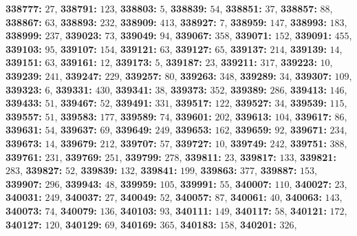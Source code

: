 \textsf{\bfseries 338777:} $27$, \textsf{\bfseries 338791:} $123$, \textsf{\bfseries 338803:} $5$, \textsf{\bfseries 338839:} $54$, \textsf{\bfseries 338851:} $37$, \textsf{\bfseries 338857:} $88$, \textsf{\bfseries 338867:} $63$, \textsf{\bfseries 338893:} $232$, \textsf{\bfseries 338909:} $413$, \textsf{\bfseries 338927:} $7$, \textsf{\bfseries 338959:} $147$, \textsf{\bfseries 338993:} $183$, \textsf{\bfseries 338999:} $237$, \textsf{\bfseries 339023:} $73$, \textsf{\bfseries 339049:} $94$, \textsf{\bfseries 339067:} $358$, \textsf{\bfseries 339071:} $152$, \textsf{\bfseries 339091:} $455$, \textsf{\bfseries 339103:} $95$, \textsf{\bfseries 339107:} $154$, \textsf{\bfseries 339121:} $63$, \textsf{\bfseries 339127:} $65$, \textsf{\bfseries 339137:} $214$, \textsf{\bfseries 339139:} $14$, \textsf{\bfseries 339151:} $63$, \textsf{\bfseries 339161:} $12$, \textsf{\bfseries 339173:} $5$, \textsf{\bfseries 339187:} $23$, \textsf{\bfseries 339211:} $317$, \textsf{\bfseries 339223:} $10$, \textsf{\bfseries 339239:} $241$, \textsf{\bfseries 339247:} $229$, \textsf{\bfseries 339257:} $80$, \textsf{\bfseries 339263:} $348$, \textsf{\bfseries 339289:} $34$, \textsf{\bfseries 339307:} $109$, \textsf{\bfseries 339323:} $6$, \textsf{\bfseries 339331:} $430$, \textsf{\bfseries 339341:} $38$, \textsf{\bfseries 339373:} $352$, \textsf{\bfseries 339389:} $286$, \textsf{\bfseries 339413:} $146$, \textsf{\bfseries 339433:} $51$, \textsf{\bfseries 339467:} $52$, \textsf{\bfseries 339491:} $331$, \textsf{\bfseries 339517:} $122$, \textsf{\bfseries 339527:} $34$, \textsf{\bfseries 339539:} $115$, \textsf{\bfseries 339557:} $51$, \textsf{\bfseries 339583:} $177$, \textsf{\bfseries 339589:} $74$, \textsf{\bfseries 339601:} $202$, \textsf{\bfseries 339613:} $104$, \textsf{\bfseries 339617:} $86$, \textsf{\bfseries 339631:} $54$, \textsf{\bfseries 339637:} $69$, \textsf{\bfseries 339649:} $249$, \textsf{\bfseries 339653:} $162$, \textsf{\bfseries 339659:} $92$, \textsf{\bfseries 339671:} $234$, \textsf{\bfseries 339673:} $14$, \textsf{\bfseries 339679:} $212$, \textsf{\bfseries 339707:} $57$, \textsf{\bfseries 339727:} $10$, \textsf{\bfseries 339749:} $242$, \textsf{\bfseries 339751:} $388$, \textsf{\bfseries 339761:} $231$, \textsf{\bfseries 339769:} $251$, \textsf{\bfseries 339799:} $278$, \textsf{\bfseries 339811:} $23$, \textsf{\bfseries 339817:} $133$, \textsf{\bfseries 339821:} $283$, \textsf{\bfseries 339827:} $52$, \textsf{\bfseries 339839:} $132$, \textsf{\bfseries 339841:} $199$, \textsf{\bfseries 339863:} $377$, \textsf{\bfseries 339887:} $153$, \textsf{\bfseries 339907:} $296$, \textsf{\bfseries 339943:} $48$, \textsf{\bfseries 339959:} $105$, \textsf{\bfseries 339991:} $55$, \textsf{\bfseries 340007:} $110$, \textsf{\bfseries 340027:} $23$, \textsf{\bfseries 340031:} $249$, \textsf{\bfseries 340037:} $27$, \textsf{\bfseries 340049:} $52$, \textsf{\bfseries 340057:} $87$, \textsf{\bfseries 340061:} $40$, \textsf{\bfseries 340063:} $143$, \textsf{\bfseries 340073:} $74$, \textsf{\bfseries 340079:} $136$, \textsf{\bfseries 340103:} $93$, \textsf{\bfseries 340111:} $149$, \textsf{\bfseries 340117:} $58$, \textsf{\bfseries 340121:} $172$, \textsf{\bfseries 340127:} $120$, \textsf{\bfseries 340129:} $69$, \textsf{\bfseries 340169:} $365$, \textsf{\bfseries 340183:} $158$, \textsf{\bfseries 340201:} $326$, 
